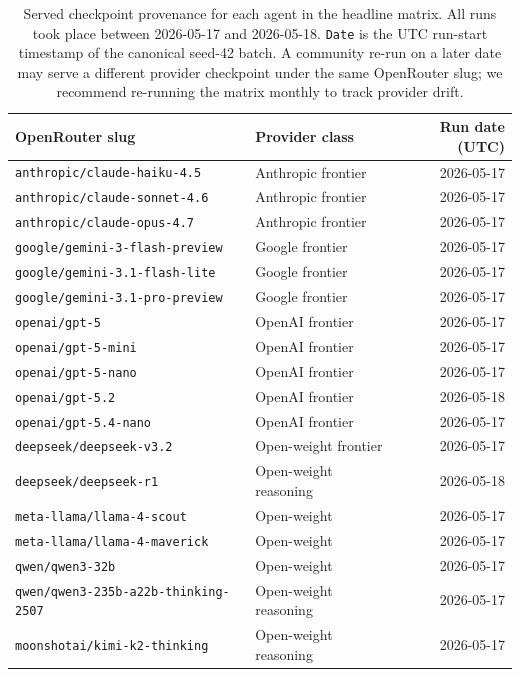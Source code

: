 \begin{table}[t]
\centering\small
\caption{Served checkpoint provenance for each agent in the headline
matrix. All runs took place between 2026-05-17 and 2026-05-18.
\texttt{Date} is the UTC run-start timestamp of the canonical seed-42
batch. A community re-run on a later date may serve a different
provider checkpoint under the same OpenRouter slug; we recommend
re-running the matrix monthly to track provider drift.}
\label{tab:model-versions}
\begin{tabular}{llr}
\toprule
OpenRouter slug & Provider class & Run date (UTC) \\
\midrule
\texttt{anthropic/claude-haiku-4.5}      & Anthropic frontier   & 2026-05-17 \\
\texttt{anthropic/claude-sonnet-4.6}     & Anthropic frontier   & 2026-05-17 \\
\texttt{anthropic/claude-opus-4.7}       & Anthropic frontier   & 2026-05-17 \\
\texttt{google/gemini-3-flash-preview}   & Google frontier      & 2026-05-17 \\
\texttt{google/gemini-3.1-flash-lite}    & Google frontier      & 2026-05-17 \\
\texttt{google/gemini-3.1-pro-preview}   & Google frontier      & 2026-05-17 \\
\texttt{openai/gpt-5}                    & OpenAI frontier      & 2026-05-17 \\
\texttt{openai/gpt-5-mini}               & OpenAI frontier      & 2026-05-17 \\
\texttt{openai/gpt-5-nano}               & OpenAI frontier      & 2026-05-17 \\
\texttt{openai/gpt-5.2}                  & OpenAI frontier      & 2026-05-18 \\
\texttt{openai/gpt-5.4-nano}             & OpenAI frontier      & 2026-05-17 \\
\texttt{deepseek/deepseek-v3.2}          & Open-weight frontier & 2026-05-17 \\
\texttt{deepseek/deepseek-r1}            & Open-weight reasoning& 2026-05-18 \\
\texttt{meta-llama/llama-4-scout}        & Open-weight          & 2026-05-17 \\
\texttt{meta-llama/llama-4-maverick}     & Open-weight          & 2026-05-17 \\
\texttt{qwen/qwen3-32b}                  & Open-weight          & 2026-05-17 \\
\texttt{qwen/qwen3-235b-a22b-thinking-2507} & Open-weight reasoning & 2026-05-17 \\
\texttt{moonshotai/kimi-k2-thinking}     & Open-weight reasoning& 2026-05-17 \\
\bottomrule
\end{tabular}
\end{table}

